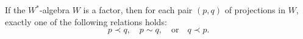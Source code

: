 If the $W^*$-algebra $W$ is a factor, then for each pair $(p, q)$ of projections in $W$, exactly one of the following relations holds:
$$p \prec q, \quad p \sim q, \quad \text{or} \quad q \prec p.$$

